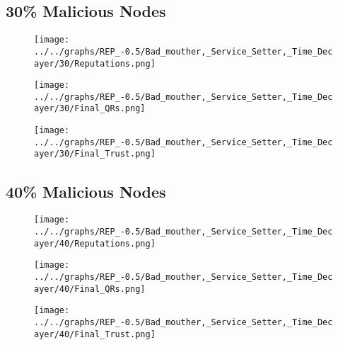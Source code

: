 \begin{minipage}[t]{0.49\columnwidth}
\subsection*{30\% Malicious Nodes}
    \begin{figure}[H]
        \centering
        \texttt{[image: ../../graphs/REP\_-0.5/Bad\_mouther,\_Service\_Setter,\_Time\_Decayer/30/Reputations.png]}
    \end{figure}
    \begin{figure}[H]
        \centering
        \texttt{[image: ../../graphs/REP\_-0.5/Bad\_mouther,\_Service\_Setter,\_Time\_Decayer/30/Final\_QRs.png]}
    \end{figure}
\end{minipage}
\begin{minipage}[t]{0.49\columnwidth}
    \begin{figure}[H]
        \centering
        \texttt{[image: ../../graphs/REP\_-0.5/Bad\_mouther,\_Service\_Setter,\_Time\_Decayer/30/Final\_Trust.png]}
    \end{figure}
\end{minipage}

\begin{minipage}[t]{0.49\columnwidth}
\subsection*{40\% Malicious Nodes}
    \begin{figure}[H]
        \centering
        \texttt{[image: ../../graphs/REP\_-0.5/Bad\_mouther,\_Service\_Setter,\_Time\_Decayer/40/Reputations.png]}
    \end{figure}
    \begin{figure}[H]
        \centering
        \texttt{[image: ../../graphs/REP\_-0.5/Bad\_mouther,\_Service\_Setter,\_Time\_Decayer/40/Final\_QRs.png]}
    \end{figure}
\end{minipage}
\begin{minipage}[t]{0.49\columnwidth}
    \begin{figure}[H]
        \centering
        \texttt{[image: ../../graphs/REP\_-0.5/Bad\_mouther,\_Service\_Setter,\_Time\_Decayer/40/Final\_Trust.png]}
    \end{figure}
\end{minipage}

